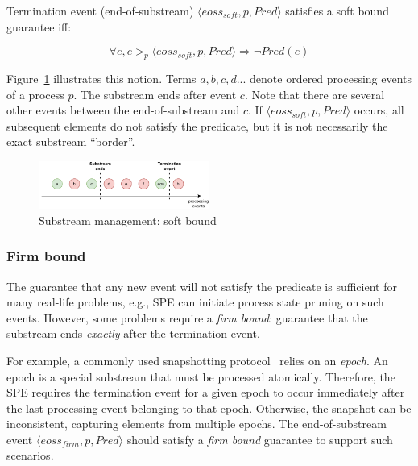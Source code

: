 \begin{definition}
Termination event (end-of-substream) $\langle eoss_{soft}, p, Pred\rangle$ satisfies a soft bound guarantee iff:

\begin{equation}
\forall e, e >_p \langle eoss_{soft}, p, Pred\rangle \Rightarrow \neg Pred(e)
\end{equation}
\end{definition}

Figure~\ref{general_guarantees} illustrates this notion. Terms $a,b,c,d...$ denote ordered processing events of a process $p$. The substream ends after event $c$. Note that there are several other events between the end-of-substream and $c$. If $\langle eoss_{soft}, p, Pred\rangle$ occurs, all subsequent elements do not satisfy the predicate, but it is not necessarily the exact substream ``border''.

\begin{figure}[t]
  \centering
  \includegraphics[width=0.50\textwidth]{pics/general-guarantee.pdf}
  \caption{Substream management: soft bound}
  \label{general_guarantees}
\end{figure}

\subsubsection{Firm bound}

The guarantee that any new event will not satisfy the predicate is sufficient for many real-life problems, e.g., SPE can initiate process state pruning on such events. However, some problems require a {\em firm bound}: guarantee that the substream ends {\em exactly} after the termination event. 

For example, a commonly used snapshotting protocol~\cite{2015arXiv150608603C, jacques2016consistent} relies on an {\em epoch}. An epoch is a special substream that must be processed atomically. Therefore, the SPE requires the termination event for a given epoch to occur immediately after the last processing event belonging to that epoch. Otherwise, the snapshot can be inconsistent, capturing elements from multiple epochs. The end-of-substream event $\langle eoss_{firm}, p, Pred\rangle$ should satisfy a {\em firm bound } guarantee to support such scenarios.

